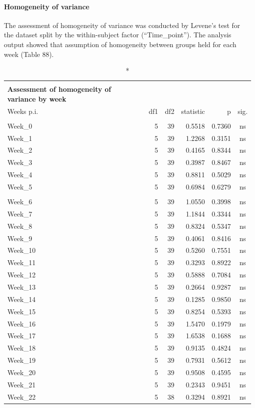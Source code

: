 \documentclass[
  12pt,
  letterpaper,
]{article}
\begin{document}
\paragraph{Homogeneity of variance}\label{homogeneity-of-variance-2}

The assessment of homogeneity of variance was conducted by Levene's test for the dataset split by the within-subject factor (``Time\_point''). The analysis output showed that assumption of homogeneity between groups held for each week (Table 88).

\begin{longtable}{l|rrrrc}
\caption*{
{\large \textbf{Appendix Table 88}} \\ 
{\small \textbf{Assessment of homogeneity of variance by week}}
} \\ 
\toprule
\multicolumn{1}{l}{Weeks p.i.} & df1 & df2 & statistic & p & sig. \\ 
\midrule\addlinespace[2.5pt]
\multicolumn{6}{l}{Pre-Infection} \\ 
\midrule\addlinespace[2.5pt]
Week\_0 & 5 & 39 & 0.5518 & 0.7360 & ns \\ 
Week\_1 & 5 & 39 & 1.2268 & 0.3151 & ns \\ 
Week\_2 & 5 & 39 & 0.4165 & 0.8344 & ns \\ 
Week\_3 & 5 & 39 & 0.3987 & 0.8467 & ns \\ 
Week\_4 & 5 & 39 & 0.8811 & 0.5029 & ns \\ 
Week\_5 & 5 & 39 & 0.6984 & 0.6279 & ns \\ 
\midrule\addlinespace[2.5pt]
\multicolumn{6}{l}{Post-Infestion} \\ 
\midrule\addlinespace[2.5pt]
Week\_6 & 5 & 39 & 1.0550 & 0.3998 & ns \\ 
Week\_7 & 5 & 39 & 1.1844 & 0.3344 & ns \\ 
Week\_8 & 5 & 39 & 0.8324 & 0.5347 & ns \\ 
Week\_9 & 5 & 39 & 0.4061 & 0.8416 & ns \\ 
Week\_10 & 5 & 39 & 0.5260 & 0.7551 & ns \\ 
Week\_11 & 5 & 39 & 0.3293 & 0.8922 & ns \\ 
Week\_12 & 5 & 39 & 0.5888 & 0.7084 & ns \\ 
Week\_13 & 5 & 39 & 0.2664 & 0.9287 & ns \\ 
Week\_14 & 5 & 39 & 0.1285 & 0.9850 & ns \\ 
Week\_15 & 5 & 39 & 0.8254 & 0.5393 & ns \\ 
Week\_16 & 5 & 39 & 1.5470 & 0.1979 & ns \\ 
Week\_17 & 5 & 39 & 1.6538 & 0.1688 & ns \\ 
Week\_18 & 5 & 39 & 0.9135 & 0.4824 & ns \\ 
Week\_19 & 5 & 39 & 0.7931 & 0.5612 & ns \\ 
Week\_20 & 5 & 39 & 0.9508 & 0.4595 & ns \\ 
Week\_21 & 5 & 39 & 0.2343 & 0.9451 & ns \\ 
Week\_22 & 5 & 38 & 0.3294 & 0.8921 & ns \\ 
\bottomrule
\end{longtable}
\end{document}
